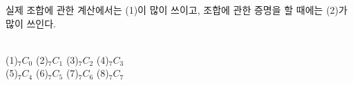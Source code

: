 \documentclass{oblivoir}
\begin{document}
\bigskip
실제 조합에 관한 계산에서는 (1)이 많이 쓰이고, 조합에 관한 증명을 할 때에는 (2)가 많이 쓰인다.

\bigskip
%
\label{comb9}\\
(1)\;\;\(_7C_0\)\hspace{0.2\textwidth}
(2)\;\;\(_7C_1\)\hspace{0.2\textwidth}
(3)\;\;\(_7C_2\)\hspace{0.2\textwidth}
(4)\;\;\(_7C_3\)\hspace{0.2\textwidth}\\[10pt]
(5)\;\;\(_7C_4\)\hspace{0.2\textwidth}
(6)\;\;\(_7C_5\)\hspace{0.2\textwidth}
(7)\;\;\(_7C_6\)\hspace{0.2\textwidth}
(8)\;\;\(_7C_7\)

\newpage
\mbox{}
\newpage
\end{document}
